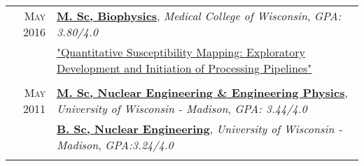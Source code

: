 
\\[2mm]
 \begin{tabular}{r|p{15cm}}

\textsc{May 2016} & \href{https://app.box.com/s/62ffckadt53x8k93p9gp6ylbpqj9vscw}{\textbf{M. Sc, Biophysics}}, \emph{Medical College of Wisconsin}, \textit{GPA: 3.80/4.0} \\
		  & \href{https://app.box.com/s/o8kksc6n51qpjzc3clfa127xtdfkayzd}{\small"Quantitative Susceptibility Mapping: Exploratory Development and Initiation of Processing Pipelines"} \\
\multicolumn{1}{c}{} \\

\textsc{May 2011} & \href{https://app.box.com/s/yyxi60lex92ovm7dus1d5xu9xshdqd91}{\textbf{M. Sc, Nuclear Engineering \& Engineering Physics}}, \emph{University of Wisconsin - Madison}, \textit{GPA: 3.44/4.0} \\
   & \href{https://app.box.com/s/yyxi60lex92ovm7dus1d5xu9xshdqd91}{\textbf{B. Sc, Nuclear Engineering}}, \emph{University of Wisconsin - Madison}, \textit{GPA:3.24/4.0} \\

\multicolumn{1}{c}{} \\

\end{tabular}

